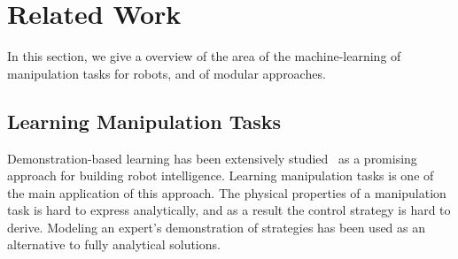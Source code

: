 \section{Related Work}
\label{sec:related}
In this section, we give a overview of the area of the
machine-learning of manipulation tasks for robots, and of modular
approaches.



\subsection{Learning Manipulation Tasks}
Demonstration-based learning has been extensively
studied~\citep{calinon2007learning,dillmann2004teaching,kulic2012incremental}
as a promising approach for building robot
intelligence. %
Learning manipulation tasks is one of the main application of this
approach. The physical properties of a manipulation task is hard to
express analytically, and as a result the control strategy is hard to derive. Modeling an expert's demonstration
of strategies has been used as an alternative to fully analytical
solutions.

